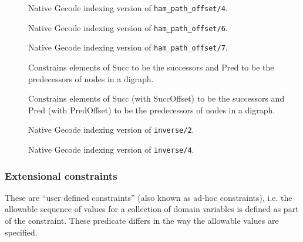 \begin{description}
\item[]
Native Gecode indexing version of {\tt ham_path_offset/4}.

\item[]
Native Gecode indexing version of {\tt ham_path_offset/6}.

\item[]
Native Gecode indexing version of {\tt ham_path_offset/7}.

\item[]
Constrains elements of Succ to be the successors and
Pred to be the predecessors of nodes in a digraph.

\item[]
Constrains elements of Succ (with SuccOffset) to be the successors and
Pred (with PredOffset) to be the predecessors of nodes in a digraph.

\item[]
Native Gecode indexing version of {\tt inverse/2}.

\item[]
Native Gecode indexing version of {\tt inverse/4}.

\end{description}
 
\subsubsection{Extensional constraints}
These are ``user defined constraints'' (also known as ad-hoc
 constraints), i.e. the allowable sequence of values for a
collection of domain variables is defined as part of the constraint. These
predicate differs in the way the allowable values are specified.

